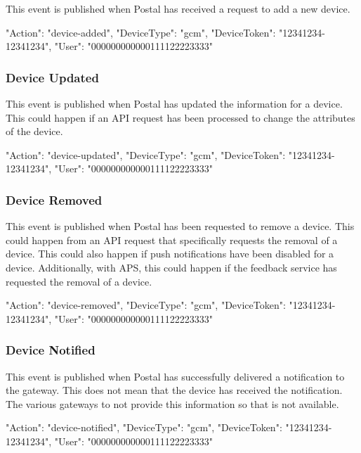 \documentclass[12pt]{article}
\begin{document}
This event is published when Postal has received a request to add a new device.

\begin{Terminal}
{
  "Action": "device-added",
  "DeviceType": "gcm",
  "DeviceToken": "12341234-12341234",
  "User": "000000000000111122223333"
}
\end{Terminal}

\subsubsection{Device Updated}

This event is published when Postal has updated the information for a device.
This could happen if an API request has been processed to change the attributes of the device.

\begin{Terminal}
{
  "Action": "device-updated",
  "DeviceType": "gcm",
  "DeviceToken": "12341234-12341234",
  "User": "000000000000111122223333"
}
\end{Terminal}

\subsubsection{Device Removed}

This event is published when Postal has been requested to remove a device.
This could happen from an API request that specifically requests the removal of a device.
This could also happen if push notifications have been disabled for a device.
Additionally, with APS, this could happen if the feedback service has requested the removal of a device.

\begin{Terminal}
{
  "Action": "device-removed",
  "DeviceType": "gcm",
  "DeviceToken": "12341234-12341234",
  "User": "000000000000111122223333"
}
\end{Terminal}

\subsubsection{Device Notified}

This event is published when Postal has successfully delivered a notification to the gateway.
This does not mean that the device has received the notification.
The various gateways to not provide this information so that is not available.

\begin{Terminal}
{
  "Action": "device-notified",
  "DeviceType": "gcm",
  "DeviceToken": "12341234-12341234",
  "User": "000000000000111122223333"
}
\end{Terminal}
\end{document}
